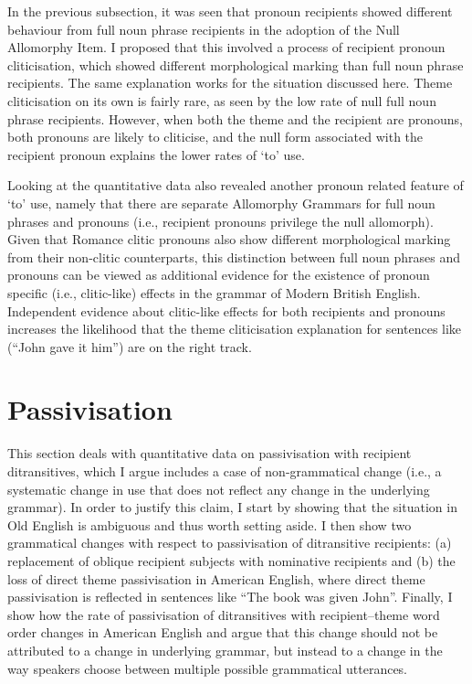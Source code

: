 	In the previous subsection, it was seen that pronoun recipients showed different behaviour from full noun phrase recipients in the adoption of the Null Allomorphy Item. I proposed that this involved a process of recipient pronoun cliticisation, which showed different morphological marking than full noun phrase recipients. The same explanation works for the situation discussed here. Theme cliticisation on its own is fairly rare, as seen by the low rate of null full noun phrase recipients. However, when both the theme and the recipient are pronouns, both pronouns are likely to cliticise, and the null form associated with the recipient pronoun explains the lower rates of `to' use.
	
	Looking at the quantitative data also revealed another pronoun related feature of `to' use, namely that there are separate Allomorphy Grammars for full noun phrases and pronouns (i.e., recipient pronouns privilege the null allomorph). Given that Romance clitic pronouns also show different morphological marking from their non-clitic counterparts, this distinction between full noun phrases and pronouns can be viewed as additional evidence for the existence of pronoun specific (i.e., clitic-like) effects in the grammar of Modern British English. Independent evidence about clitic-like effects for both recipients and pronouns increases the likelihood that the theme cliticisation explanation for sentences like (``John gave it him'') are on the right track.

	\section{Passivisation}\label{sec:en-pas}

	This section deals with quantitative data on passivisation with recipient ditransitives, which I argue includes a case of non-grammatical change (i.e., a systematic change in use that does not reflect any change in the underlying grammar). In order to justify this claim, I start by showing that the situation in Old English is ambiguous and thus worth setting aside. I then show two grammatical changes with respect to passivisation of ditransitive recipients: (a) replacement of oblique recipient subjects with nominative recipients and (b) the loss of direct theme passivisation in American English, where direct theme passivisation is reflected in sentences like ``The book was given John''. Finally, I show how the rate of passivisation of ditransitives with recipient--theme word order changes in American English and argue that this change should not be attributed to a change in underlying grammar, but instead to a change in the way speakers choose between multiple possible grammatical utterances. 


